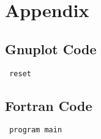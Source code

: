 \documentclass[twocolumn]{article} \usepackage{graphicx, epsfig} \usepackage{fixltx2e} \usepackage{hyperref} \usepackage{setspace} \usepackage{ctable}
\begin{document}
\section{Appendix}

\subsection{Gnuplot Code}

\begin{verbatim} reset

\end{verbatim}

\subsection{Fortran Code}

\begin{verbatim} program main

\end{verbatim}
\end{document}

